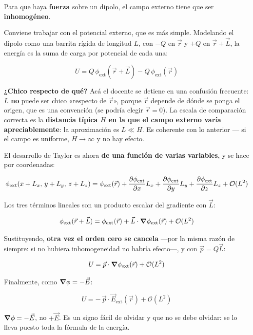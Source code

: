 \documentclass[12pt,a4paper]{article}
\begin{document}
\begin{keybox}
Para que haya \textbf{fuerza} sobre un dipolo, el campo externo tiene que ser
\textbf{inhomogéneo}.
\end{keybox}

Conviene trabajar con el potencial externo, que es más simple. Modelando el
dipolo como una barrita rígida de longitud $L$, con $-Q$ en $\vec r$ y $+Q$ en
$\vec r + \vec L$, la energía es la suma de carga por potencial de cada una:

\[
U = Q\,\phi_{\text{ext}}(\vec r + \vec L) - Q\,\phi_{\text{ext}}(\vec r)
\]

\textbf{¿Chico respecto de qué?} Acá el docente se detiene en una confusión
frecuente: $L$ \textbf{no} puede ser chico «respecto de $\vec r$», porque
$\vec r$ depende de dónde se ponga el origen, que es una convención (se podría
elegir $\vec r = 0$). La escala de comparación correcta es la \textbf{distancia
típica $H$ en la que el campo externo varía apreciablemente}: la aproximación es
$L \ll H$. Es coherente con lo anterior --- si el campo es uniforme,
$H\to\infty$ y no hay efecto.

El desarrollo de Taylor es ahora \textbf{de una función de varias variables}, y se
hace por coordenadas:

\[
\phi_{\text{ext}}(x + L_x,\, y + L_y,\, z + L_z)
= \phi_{\text{ext}}(\vec r)
+ \pdv{\phi_{\text{ext}}}{x}L_x
+ \pdv{\phi_{\text{ext}}}{y}L_y
+ \pdv{\phi_{\text{ext}}}{z}L_z
+ \mathcal{O}(L^2)
\]

Los tres términos lineales son un producto escalar del gradiente con $\vec L$:

\[
\phi_{\text{ext}}(\vec r + \vec L)
= \phi_{\text{ext}}(\vec r) + \vec L\cdot\grad\phi_{\text{ext}}(\vec r)
+ \mathcal{O}(L^2)
\]

Sustituyendo, \textbf{otra vez el orden cero se cancela} ---por la misma razón de
siempre: si no hubiera inhomogeneidad no habría efecto---, y con
$\vec p = Q\vec L$:

\[
U = \vec p\cdot\grad\phi_{\text{ext}}(\vec r) + \mathcal{O}(L^2)
\]

Finalmente, como $\grad\phi = -\vec E$:

\[
\boxed{\;U = -\,\vec p\cdot\vec E_{\text{ext}}(\vec r) + \mathcal{O}(L^2)\;}
\]

\begin{warnbox}[El signo]
$\grad\phi = -\vec E$, no $+\vec E$. Es un signo fácil de olvidar y que no se debe
olvidar: se lo lleva puesto toda la fórmula de la energía.
\end{warnbox}
\end{document}
